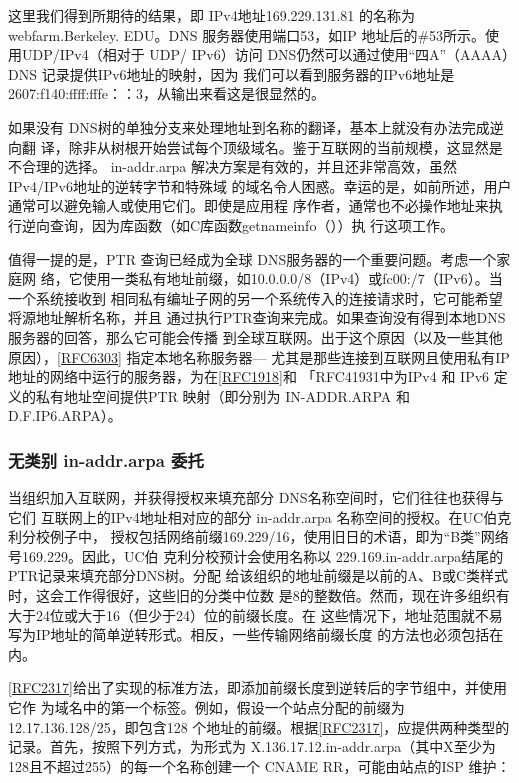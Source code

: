 这里我们得到所期待的结果，即 IPv4地址169.229.131.81 的名称为 webfarm.Berkeley.
EDU。DNS 服务器使用端口53，如IP 地址后的\#53所示。使用UDP/IPv4（相对于 UDP/
IPv6）访问 DNS仍然可以通过使用“四A”（AAAA）DNS 记录提供IPv6地址的映射，因为
我们可以看到服务器的IPv6地址是 2607:f140:ffff:fffe：：3，从输出来看这是很显然的。

如果没有 DNS树的单独分支来处理地址到名称的翻译，基本上就没有办法完成逆向翻
译，除非从树根开始尝试每个顶级域名。鉴于互联网的当前规模，这显然是不合理的选择。
in-addr.arpa 解决方案是有效的，并且还非常高效，虽然IPv4/IPv6地址的逆转字节和特殊域
的域名令人困惑。幸运的是，如前所述，用户通常可以避免输人或使用它们。即使是应用程
序作者，通常也不必操作地址来执行逆向查询，因为库函数（如C库函数getnameinfo（））执
行这项工作。

值得一提的是，PTR 查询已经成为全球 DNS服务器的一个重要问题。考虑一个家庭网
络，它使用一类私有地址前缀，如10.0.0.0/8（IPv4）或fc00:/7（IPv6）。当一个系统接收到
相同私有编址子网的另一个系统传入的连接请求时，它可能希望将源地址解析名称，并且
通过执行PTR查询来完成。如果查询没有得到本地DNS服务器的回答，那么它可能会传播
到全球互联网。出于这个原因（以及一些其他原因），\href{https://www.rfc-editor.org/rfc/rfc6303}{[RFC6303]} 指定本地名称服务器—
尤其是那些连接到互联网且使用私有IP地址的网络中运行的服务器，为在\href{https://www.rfc-editor.org/rfc/rfc1918}{[RFC1918]}和
「RFC41931中为IPv4 和 IPv6 定义的私有地址空间提供PTR 映射（即分别为 IN-ADDR.ARPA
和 D.F.IP6.ARPA）。

\subsubsection{无类别 in-addr.arpa 委托}

当组织加入互联网，并获得授权来填充部分 DNS名称空间时，它们往往也获得与它们
互联网上的IPv4地址相对应的部分 in-addr.arpa 名称空间的授权。在UC伯克利分校例子中，
授权包括网络前缀169.229/16，使用旧日的术语，即为“B类”网络号169.229。因此，UC伯
克利分校预计会使用名称以 229.169.in-addr.arpa结尾的PTR记录来填充部分DNS树。分配
给该组织的地址前缀是以前的A、B或C类样式时，这会工作得很好，这些旧的分类中位数
是8的整数倍。然而，现在许多组织有大于24位或大于16（但少于24）位的前缀长度。在
这些情况下，地址范围就不易写为IP地址的简单逆转形式。相反，一些传输网络前缀长度
的方法也必须包括在内。

\href{https://www.rfc-editor.org/rfc/rfc2317}{[RFC2317]}给出了实现的标准方法，即添加前缀长度到逆转后的字节组中，并使用它作
为域名中的第一个标签。例如，假设一个站点分配的前缀为12.17.136.128/25，即包含128
个地址的前缀。根据\href{https://www.rfc-editor.org/rfc/rfc2317}{[RFC2317]}，应提供两种类型的记录。首先，按照下列方式，为形式为
X.136.17.12.in-addr.arpa（其中X至少为128且不超过255）的每一个名称创建一个 CNAME
RR，可能由站点的ISP 维护：

